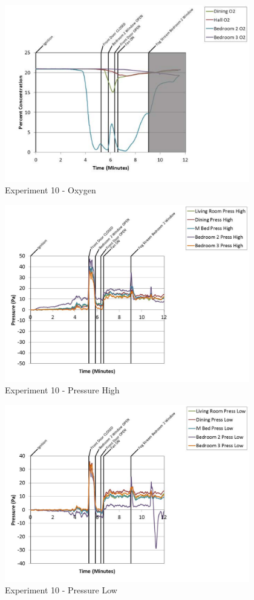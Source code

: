 \documentclass{article}
\begin{document}
\begin{appendices}
	\begin{figure}[h!]
		\centering
		\includegraphics[height=3.05in]{0_Images/Results_Charts/Exp_10_Charts/Oxygen.pdf}
		\caption{Experiment 10 - Oxygen}
	\end{figure}
 
	\clearpage

	\begin{figure}[h!]
		\centering
		\includegraphics[height=3.05in]{0_Images/Results_Charts/Exp_10_Charts/PressureHigh.pdf}
		\caption{Experiment 10 - Pressure High}
	\end{figure}
 

	\begin{figure}[h!]
		\centering
		\includegraphics[height=3.05in]{0_Images/Results_Charts/Exp_10_Charts/PressureLow.pdf}
		\caption{Experiment 10 - Pressure Low}
	\end{figure}
 

\end{appendices}
\end{document}
